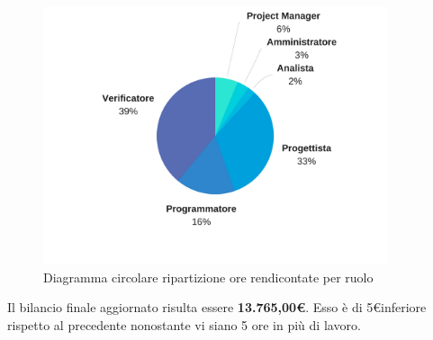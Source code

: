 \begin{figure}[H] 
	\centering 
	\includegraphics[width=0.9\textwidth]{images/CircolareSoloRendicontateNuovo.png} 
	\caption{Diagramma circolare ripartizione ore rendicontate per ruolo}
	\label{CircolareSoloRendicontate}
\end{figure}

Il bilancio finale aggiornato risulta essere \textbf{13.765,00\euro}. Esso è di 5\euro inferiore rispetto al precedente nonostante vi siano 5 ore in più di lavoro.

